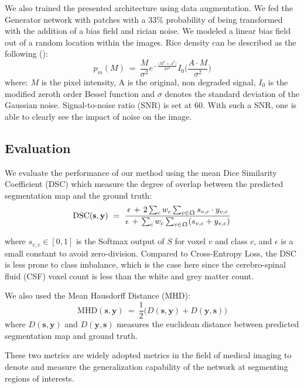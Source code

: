 \documentclass[preprint,12pt]{elsarticle}
\renewcommand{\vec}[1]{\mathbf{#1}}
\newcommand{\mr}[1]{\mathrm{#1}}
\newcommand{\yy}{\vec{y}}
\newcommand{\sss}{\vec{s}}
\newcommand{\img}{\Upomega}
\begin{document}
We also trained the presented architecture using data augmentation. We fed the Generator network with patches with a 33\% probability of being transformed with the addition of a bias field and rician noise. We modeled a linear bias field out of a random location within the images. Rice density can be described as the following  (\cite{Gudbjartsson1996}):
\begin{equation}
    p_m(M) \ = \ \frac{M}{\sigma^2} e^{-\frac{\big(M^2 +A^2\big)}{2 \sigma^2}} I_0 \Big(\frac{A \cdot M}{\sigma^2} \Big)
\end{equation}
where: $M$ is the pixel intensity, A is the original, non degraded signal, $I_0$ is the modified zeroth order Bessel function and $\sigma$ denotes the standard deviation of the Gaussian noise. Signal-to-noise ratio (SNR) is set at 60. With such a SNR, one is able to clearly see the impact of noise on the image.

\subsection{Evaluation}

We evaluate the performance of our method using the mean Dice Similarity Coefficient (DSC) which measure the degree of overlap between the predicted segmentation map and the ground truth:
\begin{equation}
    \mr{DSC}(\sss,\yy) \ = \ \frac{\epsilon \, + \, 2 \sum_{c} w_c \sum_{v \in \img} s_{v,c} \cdot y_{v,c}}{\epsilon \, + \, \sum_{c} w_c \sum_{v \in \img} (s_{v,c} +  y_{v,c})}
\end{equation}{}

where $s_{v,c} \in [0, 1]$ is the Softmax output of $S$ for voxel $v$ and class $c$, and $\epsilon$ is a small constant to avoid zero-division. Compared to Cross-Entropy Loss, the DSC is less prone to class imbalance, which is the case here since the cerebro-spinal fluid (CSF) voxel count is less than the white and grey matter count.

We also used the Mean Hausdorff Distance (MHD): \\
\begin{equation}
\mr{MHD}(\sss, \yy) \ = \ \frac{1}{2}\big(D (\sss, \yy) + D(\yy, \sss)\big)
\end{equation}
where $D (\sss, \yy)$  and $D (\yy, \sss)$ measures the euclidean distance between predicted segmentation map and ground truth.

These two metrics are widely adopted metrics in the field of medical imaging to denote and measure the generalization capability of the network at segmenting regions of interests.
\end{document}
